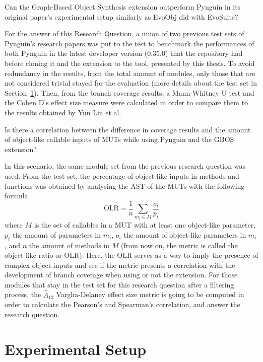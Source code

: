 \documentclass[%
  chapterprefix=false,%
  open=right,%
  twoside=true,%
  paper=a4,%
  logofile={Figures/logo.png},%
  thesistype=master,%
  UKenglish,%
]{se2thesis}
\begin{document}
\begin{resq}
  Can the Graph-Based Object Synthesis extension outperform Pynguin in its original paper's experimental setup similarly as EvoObj did with EvoSuite?
\end{resq}

For the answer of this Research Question, a union of two previous test sets of Pynguin's research papers was put to the test to benchmark the performances of both Pynguin in the latest developer version (0.35.0) that the repository had before cloning it and the extension to the tool, presented by this thesis.
To avoid redundancy in the results, from the total amount of modules, only those that are not considered trivial stayed for the evaluation (more details about the test set in Section~\ref{sec:experimental_setup}).
Then, from the branch coverage results, a Mann-Whitney U test and the Cohen D's effect size measure were calculated in order to compare them to the results obtained by Yun Lin et al. 

\begin{resq}
  Is there a correlation between the difference in coverage results and the amount of object-like callable inputs of MUTs while using Pynguin and the GBOS extension?
\end{resq}

In this scenario, the same module set from the previous research question was used.
From the test set, the percentage of object-like inputs in methods and functions was obtained by analysing the AST of the MUTs with the following formula
\begin{equation}\label{eq:olr}
\text{OLR} = \frac{1}{n}\sum_{m_i \in M} \frac{o_i}{p_i}
\end{equation}
where \(M\) is the set of callables in a MUT with at least one object-like parameter, \(p_i\) the amount of parameters in \(m_i\), \(o_i\) the amount of object-like parameters in \(m_i\), and \(n\) the amount of methods in \(M\) (from now on, the metric is called the object-like ratio or OLR).
Here, the OLR serves as a way to imply the presence of complex object inputs and see if the metric presents a correlation with the development of branch coverage when using or not the extension.
For those modules that stay in the test set for this research question after a filtering process, the \(\hat{A}_{12}\) Vargha-Delaney effect size metric is going to be computed in order to calculate the Pearson's and Spearman's correlation, and answer the research question. 

\section{Experimental Setup}\label{sec:experimental_setup}
\end{document}
